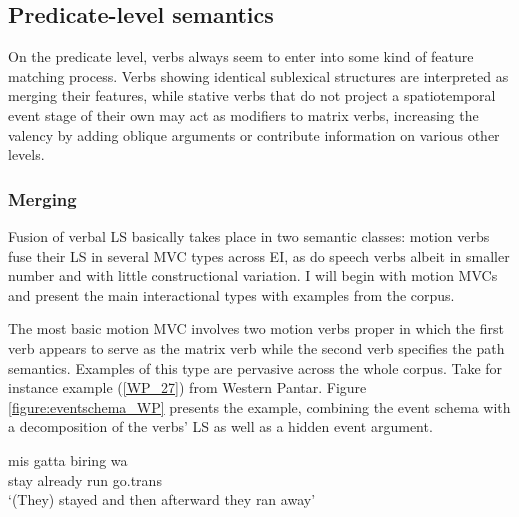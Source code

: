 \subsection{Predicate-level semantics} \label{sec:predicate-level}

On the predicate level, verbs always seem to enter into some kind of feature matching process. Verbs showing identical sublexical structures are interpreted as merging their features, while stative verbs that do not project a spatiotemporal event stage of their own may act as modifiers to matrix verbs, increasing the valency by adding oblique arguments or contribute information on various other levels.

\subsubsection{Merging}
\label{sec:merging}

Fusion of verbal LS basically takes place in two semantic classes: motion verbs fuse their LS in several MVC types across EI, as do speech verbs albeit in smaller number and with little constructional variation. I will begin with motion MVCs and present the main interactional types with examples from the corpus.

The most basic motion MVC involves two motion verbs proper in which the first verb appears to serve as the matrix verb while the second verb specifies the path semantics. Examples of this type are pervasive across the whole corpus. Take for instance example (\ref{WP_27}) from Western Pantar. Figure \ref{figure:eventschema_WP} presents the example, combining the event schema with a decomposition of the verbs' LS as well as a hidden event argument.

\pex \label{WP_27}
\ea
\gll mis gatta biring wa \\
stay already run go.\acs{trans} \\
\glft `(They) stayed and then afterward they ran away' \ 
\z
\xe

